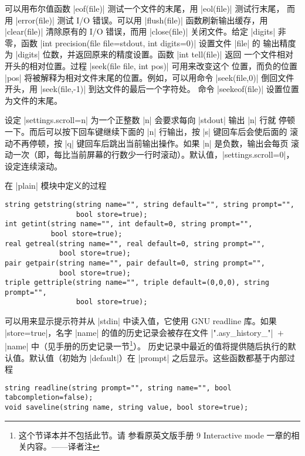\documentclass{ctexbook}
\newcommand*\prgname[1]{\textsf{#1}}
\newcommand\transnote[1]{\footnote{#1——译者注}}
\begin{document}
可以用布尔值函数 |eof(file)| 测试一个文件的末尾，用 |eol(file)| 测试行末尾，
而用 |error(file)| 测试 I/O 错误。可以用 |flush(file)| 函数刷新输出缓存，用
|clear(file)| 清除原有的 I/O 错误，而用 |close(file)| 关闭文件。给定 |digits|
非零，函数 |int precision(file file=stdout, int digits=0)| 设置文件 |file| 的
输出精度为 |digits| 位数，并返回原来的精度设置。函数 |int tell(file)| 返回
一个文件相对开头的相对位置。过程 |seek(file file, int pos)| 可用来改变这个
位置，而负的位置 |pos| 将被解释为相对文件末尾的位置。例如，可以用命令
|seek(file,0)| 倒回文件开头，用 |seek(file,-1)| 到达文件的最后一个字符处。
命令 |seekeof(file)| 设置位置为文件的末尾。

设定 |settings.scroll=n| 为一个正整数 |n| 会要求每向 |stdout| 输出 |n| 行就
停顿一下。而后可以按下回车键继续下面的 |n| 行输出，按 |s| 键回车后会使后面的
滚动不再停顿，按 |q| 键回车后跳出当前输出操作。如果 |n| 是负数，输出会每页
滚动一次（即，每比当前屏幕的行数少一行时滚动）。默认值，|settings.scroll=0|，
设定连续滚动。

在 |plain| 模块中定义的过程
\begin{lstlisting}
string getstring(string name="", string default="", string prompt="",
                 bool store=true);
int getint(string name="", int default=0, string prompt="",
           bool store=true);
real getreal(string name="", real default=0, string prompt="",
             bool store=true);
pair getpair(string name="", pair default=0, string prompt="",
             bool store=true);
triple gettriple(string name="", triple default=(0,0,0), string prompt="",
                 bool store=true);
\end{lstlisting}
可以用来显示提示符并从 |stdin| 中读入值，它使用 GNU \prgname{readline} 库。如果
|store=true|，名字 |name| 的值的历史记录会被存在文件 |".asy_history_"|%
${}+{}$|name| 中（见手册的历史记录一节\transnote{这个节译本并不包括此节。请
参看原英文版手册 9 Interactive mode 一章的相关内容。}）。
历史记录中最近的值将提供随后执行的默认值。默认值（初始为 |default|）在
|prompt| 之后显示。这些函数都基于内部过程
\begin{lstlisting}
string readline(string prompt="", string name="", bool tabcompletion=false);
void saveline(string name, string value, bool store=true);
\end{lstlisting}
\end{document}
